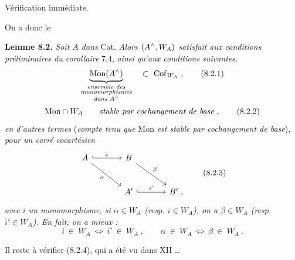 Vérification immédiate.

On a donc le

\textbf{Lemme 8.2.} \textit{Soit $A$ dans} Cat. \textit{Alors $(A^{\wedge},W_A)$ satisfait aux conditions préliminaires du corollaire} 7.4, \textit{ainsi qu'aux conditions suivantes.}
\[
\underbrace{\Mon(A\chap)}_{\substack{\textit{ensemble des}\\ \textit{monomorphismes}\\ \textit{dans } A\chap}} \quad\subset\ \Cof_{W_A}\ ,
\tag*{(8.2.1)}
\]
\[
\Mon\cap W_A \qquad \textit{stable par cochangement de base}\ ,
\tag*{(8.2.2)}
\]
\textit{en d'autres termes} (\textit{compte tenu que} Mon \textit{est stable par cochangement de base}), \textit{pour un carré cocartésien}
\[
\begin{tikzcd}[row sep=large, column sep=large]
A \arrow[r, hook, "i"] \arrow[dr, "\alpha"'] & B \arrow[dr, "\beta"] & \\
& A' \arrow[r, hook, "i'"] & B'\ ,
\end{tikzcd}
\tag*{(8.2.3)}
\]
\textit{avec $i$ un monomorphisme, si $\alpha\in W_A$ (resp. $i\in W_A$), on a $\beta\in W_A$ (resp. $i'\in W_A$). En fait, on a mieux :}
\[
i\ \in\ W_A \ \Longleftrightarrow\ i'\ \in\ W_A\ , \qquad \alpha\ \in\ W_A \ \Longleftrightarrow\ \beta\ \in\ W_A\ .
\tag*{(8.2.4)}
\]

Il reste à vérifier (8.2.4), qui a été vu dans XII \ldots

